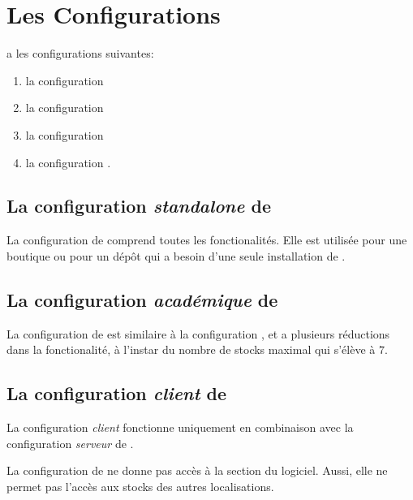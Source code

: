 \chapter{Les Configurations}\label{chap:congigurations-yeren}



\yeren a les configurations suivantes:
\begin{enumerate}[1)]
	\item la configuration 
	\item la configuration 
	\item la configuration 
	\item la configuration .\\
\end{enumerate}

\section{La configuration \emph{standalone} de \yeren}
La configuration  de \yeren comprend
toutes les fonctionalit\'es. Elle est utilis\'ee pour
une boutique ou pour un d\'ep\^ot qui a besoin d'une seule
installation de \yeren.

\section{La configuration \emph{acad\'emique} de \yeren}
La configuration  de \yeren est
similaire \`a la configuration , et
a plusieurs r\'eductions dans la fonctionalit\'e, \`a
l'instar du nombre de stocks maximal qui s'\'el\`eve 
\`a $7$.

\section{La configuration \emph{client} de \yeren}
La configuration \emph{client} fonctionne uniquement en
combinaison avec la configuration \emph{serveur} de \yeren.

La configuration  de \yeren ne donne pas
acc\`es \`a la section  du logiciel.
Aussi, elle ne permet pas l'acc\`es aux stocks des autres
localisations.

